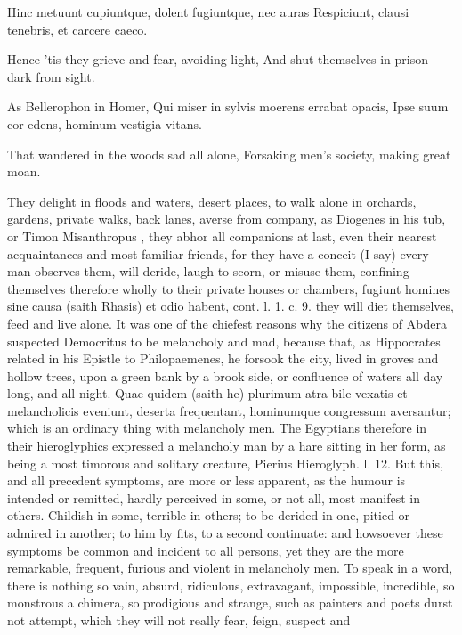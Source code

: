 {Hinc metuunt cupiuntque, dolent fugiuntque, nec auras
Respiciunt, clausi tenebris, et carcere caeco.

Hence 'tis they grieve and fear, avoiding light,
And shut themselves in prison dark from sight.

As Bellerophon in Homer,
Qui miser in sylvis moerens errabat opacis,
Ipse suum cor edens, hominum vestigia vitans.

That wandered in the woods sad all alone,
Forsaking men's society, making great moan.

They delight in floods and waters, desert places, to walk alone in
orchards, gardens, private walks, back lanes, averse from company, as
Diogenes in his tub, or Timon Misanthropus , they abhor all
companions at last, even their nearest acquaintances and most familiar
friends, for they have a conceit (I say) every man observes them, will
deride, laugh to scorn, or misuse them, confining themselves therefore
wholly to their private houses or chambers, fugiunt homines sine causa
(saith Rhasis) et odio habent, cont. l. 1. c. 9. they will diet
themselves, feed and live alone. It was one of the chiefest reasons why
the citizens of Abdera suspected Democritus to be melancholy and mad,
because that, as Hippocrates related in his Epistle to Philopaemenes,
he forsook the city, lived in groves and hollow trees, upon a
green bank by a brook side, or confluence of waters all day long, and
all night. Quae quidem (saith he) plurimum atra bile vexatis et
melancholicis eveniunt, deserta frequentant, hominumque congressum
aversantur; which is an ordinary thing with melancholy men. The
Egyptians therefore in their hieroglyphics expressed a melancholy man
by a hare sitting in her form, as being a most timorous and solitary
creature, Pierius Hieroglyph. l. 12. But this, and all precedent
symptoms, are more or less apparent, as the humour is intended or
remitted, hardly perceived in some, or not all, most manifest in
others. Childish in some, terrible in others; to be derided in one,
pitied or admired in another; to him by fits, to a second continuate:
and howsoever these symptoms be common and incident to all persons, yet
they are the more remarkable, frequent, furious and violent in
melancholy men. To speak in a word, there is nothing so vain, absurd,
ridiculous, extravagant, impossible, incredible, so monstrous a
chimera, so prodigious and strange, such as painters and poets
durst not attempt, which they will not really fear, feign, suspect and
}

